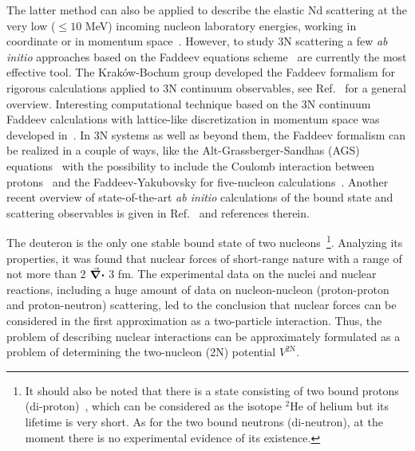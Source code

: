 The latter method can also be applied to describe the elastic Nd scattering at the very low ($\leq 10$ MeV) incoming nucleon laboratory energies, working in coordinate or in momentum space~\cite{marcucci2009n, marcucci2019hyperspherical}. However, to study 3N scattering a few \textit{ab initio} approaches based on the Faddeev equations scheme~\cite{faddeev2016scattering} are currently the most effective tool. The Krak{\'o}w-Bochum group developed the Faddeev formalism for rigorous calculations applied to 3N continuum observables, see Ref.~\cite{Glockle1996} for a general overview. Interesting computational technique based on the 3N continuum Faddeev calculations with lattice-like discretization in momentum space was developed in~\cite{rubtsova2012three}. In 3N systems as well as beyond them, the Faddeev formalism can be realized in a couple of ways, like the Alt-Grassberger-Sandhas (AGS) equations~\cite{fonseca2017numerical} with the possibility to include the Coulomb interaction between protons~\cite{deltuva2019coulomb} and the Faddeev-Yakubovsky for five-nucleon calculations~\cite{lazauskas2018solution}.  
Another recent overview of state-of-the-art \textit{ab initio} calculations of the bound state and scattering observables is given in Ref.~\cite{johnson2019bound} and references therein.

The deuteron is the only one stable bound state of two nucleons~\footnote{It should also be noted that there is a state consisting of two bound protons (di-proton)~\cite{Raciti2008}, which can be considered as the isotope $^{2}$He of helium but its lifetime is very short. As for the two bound neutrons (di-neutron), at the moment there is no experimental evidence of its existence.}. Analyzing its properties, it was found that nuclear forces of short-range nature with a range of not more than 2 $\divisionsymbol$ 3 fm. The experimental data on the nuclei and nuclear reactions, including a huge amount of data on nucleon-nucleon (proton-proton and proton-neutron) scattering, led to the conclusion that nuclear forces can be considered in the first approximation as a two-particle interaction. Thus, the problem of describing nuclear interactions can be approximately formulated as a problem of determining the two-nucleon (2N) potential $V^{\mathrm{2N}}$. %


